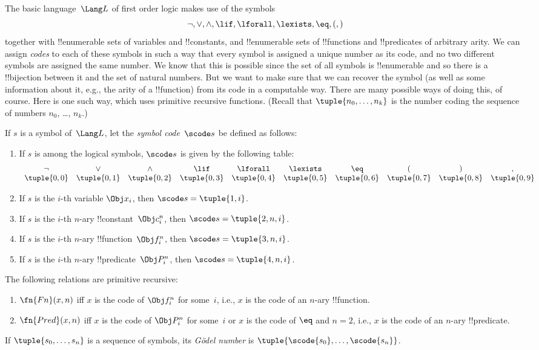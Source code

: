 \documentclass[../../include/open-logic-section]{subfiles}
\begin{document}

The basic language~$\Lang L$ of first order logic makes use of the symbols
\[
\lnot, \lor, \land, \lif, \lforall, \lexists, \eq, (, )
\]
together with !!{enumerable} sets of variables and !!{constant}s, and
!!{enumerable} sets of !!{function}s and !!{predicate}s of arbitrary
arity.  We can assign \emph{codes} to each of these symbols in such a
way that every symbol is assigned a unique number as its code, and no
two different symbols are assigned the same number.  We know that this
is possible since the set of all symbols is !!{enumerable} and so
there is a !!{bijection} between it and the set of natural numbers.
But we want to make sure that we can recover the symbol (as well as
some information about it, e.g., the arity of a !!{function}) from its
code in a computable way.  There are many possible ways of doing this,
of course.  Here is one such way, which uses primitive recursive
functions.  (Recall that $\tuple{n_0, \dots, n_k}$ is the number
coding the sequence of numbers $n_0$, \dots, $n_k$.)

\begin{defn}
If $s$ is a symbol of~$\Lang L$, let the \emph{symbol code}~$\scode s$ be
defined as follows:
\begin{enumerate}
\item If $s$ is among the logical symbols, $\scode s$ is given by the
  following table:
\[
\begin{array}{cccccccccc}
\lnot & \lor & \land & \lif & \lforall & \lexists & \eq & ( & ) & ,\\
\tuple{0, 0} & \tuple{0, 1} & \tuple{0, 2} & \tuple{0, 3} & 
\tuple{0, 4} & \tuple{0, 5} & \tuple{0, 6} & \tuple{0, 7} &
\tuple{0, 8} & \tuple{0, 9} 
\end{array}
\]
\item If $s$ is the $i$-th variable $\Obj x_i$, then $\scode s = \tuple{1, i}$.
\item If $s$ is the $i$-th $n$-ary !!{constant}~$\Obj c_i^n$, then
  $\scode s = \tuple{2, n, i}$.
\item If $s$ is the $i$-th $n$-ary !!{function}~$\Obj f_i^n$, then
  $\scode s = \tuple{3, n, i}$.
\item If $s$ is the $i$-th $n$-ary !!{predicate}~$\Obj P_i^n$, then
  $\scode s = \tuple{4, n, i}$.
\end{enumerate}
\end{defn}

\begin{prop}
The following relations are primitive recursive:
\begin{enumerate}
\item $\fn{Fn}(x, n)$ iff $x$ is the code of $\Obj f^n_i$ for
  some~$i$, i.e., $x$ is the code of an $n$-ary !!{function}.
\item $\fn{Pred}(x, n)$ iff $x$ is the code of $\Obj P^n_i$ for
  some~$i$ or $x$ is the code of $\eq$ and $n = 2$, i.e., $x$ is the
  code of an $n$-ary !!{predicate}.
\end{enumerate}
\end{prop}

\begin{defn}
If $\tuple{s_0, \dots, s_n}$ is a sequence of symbols, its
\emph{G\"odel number} is $\tuple{\scode{s_0}, \dots, \scode{s_n}}$.
\end{defn}
\end{document}
